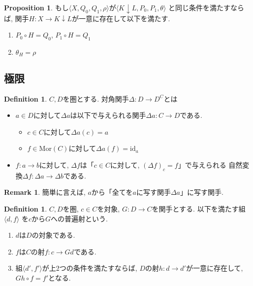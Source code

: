 \documentclass[a4paper,10pt]{article}
\theoremstyle{definition}
\newtheorem{definition}[thm]{\bfseries Definition}
\newtheorem{remark}[thm]{\bfseries Remark}    %
\newtheorem{prop}[thm]{\bfseries Proposition} %
\begin{document}
\begin{prop}
    もし$\langle X, Q_0, Q_1, \rho\rangle$が$\langle K \downarrow L, P_0, P_1, \theta \rangle$
    と同じ条件を満たすならば, 関手$H: X \rightarrow K \downarrow L$が一意に存在して以下を満たす.
    \begin{enumerate}[(1)]
        \item $P_0 \circ H = Q_0$, $P_1 \circ H = Q_1$
        \item $\theta_H=\rho$
    \end{enumerate}
\end{prop}
\subsection{極限}
\begin{definition}
    $C,D$を圏とする. 対角関手$\Delta: D \rightarrow D^{C}$とは
    \begin{itemize}
        \item $a \in D$に対して$\Delta a$は以下で与えられる関手$\Delta a: C \rightarrow D$である.
        \begin{itemize}
            \item $c \in C$に対して$\Delta a(c)=a$
            \item $f \in \textrm{Mor}(C)$に対して$\Delta a(f)=\textrm{id}_a$
        \end{itemize}
        \item $f : a \rightarrow b$に対して, $\Delta f$は「$c \in C$に対して, $(\Delta f)_c=f$」で与えられる
        自然変換$\Delta f: \Delta a \rightarrow \Delta b$である.
    \end{itemize}
\end{definition}
\begin{remark}
    簡単に言えば, $a$から「全てを$a$に写す関手$\Delta a$」に写す関手.
\end{remark}
\begin{definition}
    $C,D$を圏, $c \in C$を対象, $G: D \rightarrow C$を関手とする. 以下を満たす組$\langle d,f\rangle$
    を$c$から$G$への普遍射という.
    \begin{enumerate}[(1)]
        \item $d$は$D$の対象である.
        \item $f$は$C$の射$f: c \rightarrow Gd$である.
        \item 組$\langle d', f' \rangle$が上2つの条件を満たすならば, $D$の射$h: d \rightarrow d'$が一意に存在して,
        $Gh \circ f=f'$となる.
    \end{enumerate}
\end{definition}
\end{document}
